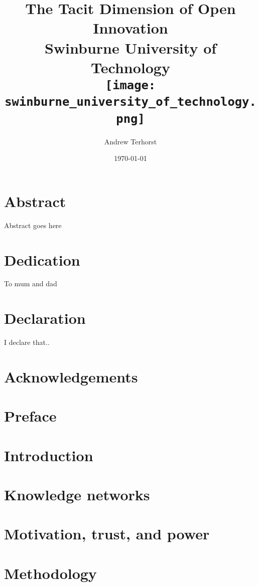 \documentclass[12pt,twoside]{report}
\title{
	{The Tacit Dimension of Open Innovation}\\
	{\large Swinburne University of Technology}\\
	{\texttt{[image: swinburne\_university\_of\_technology.png]}}
}
\author{Andrew Terhorst}
\date{\today}
\begin{document}
\onehalfspacing
\maketitle
\renewcommand{\bibname}{References}

 

\chapter*{Abstract}

Abstract goes here

\chapter*{Dedication}
To mum and dad

\chapter*{Declaration}
I declare that..


\chapter*{Acknowledgements}

\tableofcontents

\chapter*{Preface}

\chapter{Introduction}


\chapter{Knowledge networks}


\chapter{Motivation, trust, and power}

%
%
%
\chapter{Methodology}

%
%
%
\end{document}
